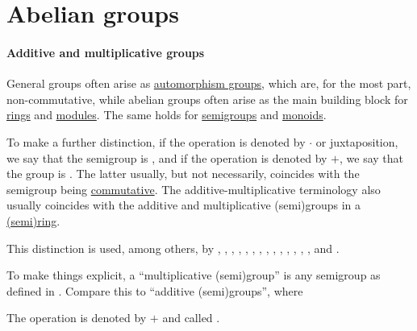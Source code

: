 \section{Abelian groups}\label{sec:abelian_groups}

\paragraph{Additive and multiplicative groups}

\begin{concept}\label{con:additive_semigroup}\mimprovised
  General groups often arise as \hyperref[def:automorphism_group]{automorphism groups}, which are, for the most part, non-commutative, while abelian groups often arise as the main building block for \hyperref[def:ring]{rings} and \hyperref[def:module]{modules}. The same holds for \hyperref[def:semigroup]{semigroups} and \hyperref[def:monoid]{monoids}.

  To make a further distinction, if the operation is denoted by \( \cdot \) or juxtaposition, we say that the semigroup is , and if the operation is denoted by \( + \), we say that the group is . The latter usually, but not necessarily, coincides with the semigroup being \hyperref[def:binary_operation/commutative]{commutative}. The additive-multiplicative terminology also usually coincides with the additive and multiplicative (semi)groups in a \hyperref[def:semiring]{(semi)ring}.

  This distinction is used, among others, by
  ,
  ,
  ,
  ,
  ,
  ,
  ,
  ,
  ,
  ,
  ,
  ,
  ,
  ,
   and
  .

  To make things explicit, a \enquote{multiplicative (semi)group} is any semigroup as defined in . Compare this to \enquote{additive (semi)groups}, where
  \begin{thmenum}
     The operation is denoted by \( + \) and called .


\end{thmenum}
\end{concept}
